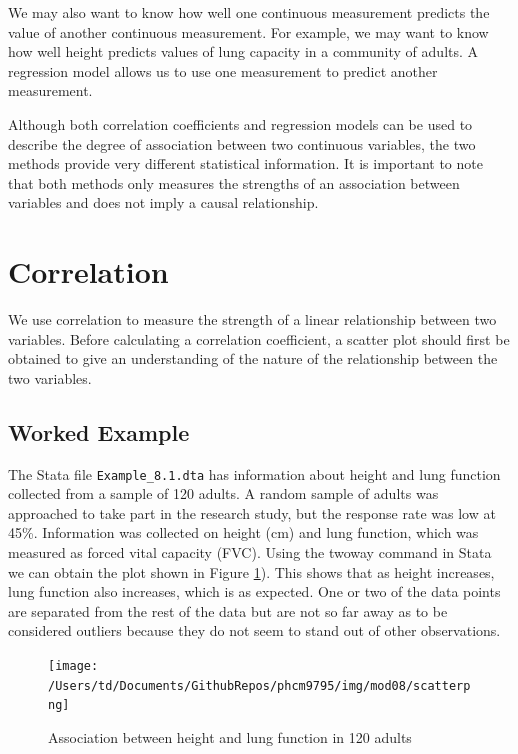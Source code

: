 \documentclass[
]{memoir}
\begin{document}
We may also want to know how well one continuous measurement predicts the value of another continuous measurement. For example, we may want to know how well height predicts values of lung capacity in a community of adults. A regression model allows us to use one measurement to predict another measurement.

Although both correlation coefficients and regression models can be used to describe the degree of association between two continuous variables, the two methods provide very different statistical information. It is important to note that both methods only measures the strengths of an association between variables and does not imply a causal relationship.

\hypertarget{correlation}{%
\section{Correlation}\label{correlation}}

We use correlation to measure the strength of a linear relationship between two variables. Before calculating a correlation coefficient, a scatter plot should first be obtained to give an understanding of the nature of the relationship between the two variables.

\hypertarget{worked-example-11}{%
\subsection{Worked Example}\label{worked-example-11}}

The Stata file \texttt{Example\_8.1.dta} has information about height and lung function collected from a sample of 120 adults. A random sample of adults was approached to take part in the research study, but the response rate was low at 45\%. Information was collected on height (cm) and lung function, which was measured as forced vital capacity (FVC). Using the twoway command in Stata we can obtain the plot shown in Figure \ref{fig:scatter-plot}). This shows that as height increases, lung function also increases, which is as expected. One or two of the data points are separated from the rest of the data but are not so far away as to be considered outliers because they do not seem to stand out of other observations.

\begin{figure}
\texttt{[image: /Users/td/Documents/GithubRepos/phcm9795/img/mod08/scatterpng]} \caption{Association between height and lung function in 120 adults}\label{fig:scatter-plot}
\end{figure}
\end{document}
